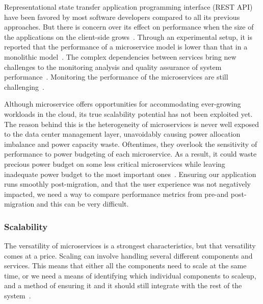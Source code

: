 \par Representational state transfer application programming interface (REST API) have been favored by most software developers compared to all its previous approaches. But there is concern over its effect on performance when the size of the applications on the client-side grows~\cite{Ghebremicael2017}. Through an experimental setup, it is reported that the performance of a microservice model is lower than that in a monolithic model~\cite{Johansson2019}. The complex dependencies between services bring new challenges to the monitoring analysis and quality assurance of system performance~\cite{Zhihui2020}. Monitoring the performance of the microservices are still challenging~\cite{Saman2017, Venugopal2017}. 

\par Although microservice offers opportunities for accommodating ever-growing workloads in the cloud, its true scalability potential has not been exploited yet. The reason behind this is the heterogeneity of microservices is never well exposed to the data center management layer, unavoidably causing power allocation imbalance and power capacity waste. Oftentimes, they overlook the sensitivity of performance to power budgeting of each microservice. As a result, it could waste precious power budget on some less critical microservices while leaving inadequate power budget to the most important ones~\cite{Hou2019}. Ensuring our application runs smoothly post-migration, and that the user experience was not negatively impacted, we need a way to compare performance metrics from pre-and post-migration and this can be very difficult.


\subsubsection{Scalability}%

The versatility of microservices is a strongest characteristics, but that versatility comes at a price. Scaling can involve handling several different components and services. This means that either all the components need to scale at the same time, or we need a means of identifying which individual components to scaleup, and a method of ensuring it and it should still integrate with the rest of the system~\cite{Meshenberg2016}. 

